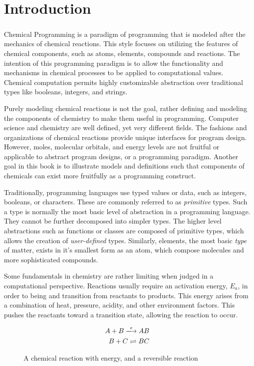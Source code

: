 
\chapter{Introduction}
\paragraph{   } Chemical Programming is a paradigm of programming that is modeled after the mechanics of chemical reactions. This style focuses on utilizing the features of chemical components, such as atoms, elements, compounds and reactions. The intention of this programming paradigm is to allow the functionality and mechanisms in chemical processes to be applied to computational values. Chemical computation permits highly customizable abstraction over traditional types like booleans, integers, and strings.
\par Purely modeling chemical reactions is not the goal, rather defining and modeling the components of chemistry to make them useful in programming. Computer science and chemistry are well defined, yet very different fields. The fashions and organizations of chemical reactions provide unique interfaces for program design. However, moles, molecular orbitals, and energy levels are not fruitful or applicable to abstract program designs, or a programming paradigm. Another goal in this book is to illustrate models and definitions such that components of chemicals can exist more fruitfully as a programming construct. 

\par Traditionally, programming languages use typed values or data, such as integers, booleans, or characters. These are commonly referred to as \textit{primitive} types. Such a type is normally the most basic level of abstraction in a programming language. They cannot be further decomposed into simpler types. The higher level abstractions such as functions or classes are composed of primitive types, which allows the creation of \textit{user-defined} types. Similarly, elements, the most basic \textit{type} of matter, exists in it's smallest form as an atom, which compose molecules and more sophisticated compounds.

\par Some fundamentals in chemistry are rather limiting when judged in a computational perspective. Reactions usually require an activation energy, $E_a$, in order to being and transition from reactants to products. This energy arises from a combination of heat, pressure, acidity, and other environment factors. This pushes the reactants toward a transition state, allowing the reaction to occur.  \break
\begin{figure}[h]
    \begin{align*}
          A + B \xlongrightarrow{e} AB \\
          B + C \rightleftharpoons BC
     \end{align*}
     \caption{A chemical reaction with energy, and a reversible reaction}
\end{figure}


